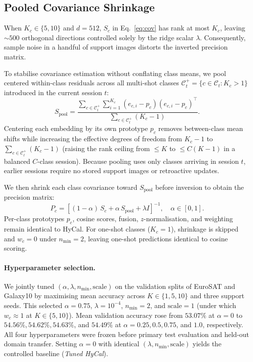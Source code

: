 \documentclass[letterpaper]{article} %
\newcommand{\nmin}{n_{\min}}
\begin{document}
\subsection{Pooled Covariance Shrinkage}

When $K_c \in \{5, 10\}$ and $d = 512$, $S_c$ in Eq.~\eqref{eq:cov} has rank at most $K_c$, leaving $\sim 500$ orthogonal directions controlled solely by the ridge scalar $\lambda$. Consequently, sample noise in a handful of support images distorts the inverted precision matrix.

To stabilise covariance estimation without conflating class means, we pool centered within-class residuals across all multi-shot classes $\mathcal{C}_t^{+} = \{c \in \mathcal{C}_t : K_c > 1\}$ introduced in the current session $t$:
\begin{equation}
S_{\mathrm{pool}} = \frac{\sum_{c \in \mathcal{C}_t^{+}} \sum_{i=1}^{K_c} (e_{c,i} - p_c)(e_{c,i} - p_c)^\top}{\sum_{c \in \mathcal{C}_t^{+}} (K_c - 1)}.
\label{eq:spool}
\end{equation}
Centering each embedding by its own prototype $p_c$ removes between-class mean shifts while increasing the effective degrees of freedom from $K_c - 1$ to $\sum_{c \in \mathcal{C}_t^{+}} (K_c - 1)$ (raising the rank ceiling from $\le K$ to $\le C(K-1)$ in a balanced $C$-class session). Because pooling uses only classes arriving in session $t$, earlier sessions require no stored support images or retroactive updates.

We then shrink each class covariance toward $S_{\mathrm{pool}}$ before inversion to obtain the precision matrix:
\begin{equation}
P_c = \left[ (1 - \alpha)\, S_c + \alpha\, S_{\mathrm{pool}} + \lambda I \right]^{-1}, \quad \alpha \in [0, 1].
\label{eq:shrink}
\end{equation}
Per-class prototypes $p_c$, cosine scores, fusion, $z$-normalisation, and weighting remain identical to HyCal. For one-shot classes ($K_c = 1$), shrinkage is skipped and $w_c = 0$ under $\nmin = 2$, leaving one-shot predictions identical to cosine scoring.

\paragraph{Hyperparameter selection.}
We jointly tuned $(\alpha, \lambda, \nmin, \mathrm{scale})$ on the validation splits of EuroSAT and Galaxy10 by maximising mean accuracy across $K \in \{1, 5, 10\}$ and three support seeds. This selected $\alpha = 0.75$, $\lambda = 10^{-4}$, $\nmin = 2$, and $\mathrm{scale} = 1$ (under which $w_c \approx 1$ at $K \in \{5, 10\}$). Mean validation accuracy rose from $53.07\%$ at $\alpha = 0$ to $54.56\%, 54.62\%, 54.63\%$, and $54.49\%$ at $\alpha = 0.25, 0.5, 0.75$, and $1.0$, respectively. All four hyperparameters were frozen before primary test evaluation and held-out domain transfer. Setting $\alpha = 0$ with identical $(\lambda, \nmin, \mathrm{scale})$ yields the controlled baseline (\textit{Tuned HyCal}).
\end{document}
